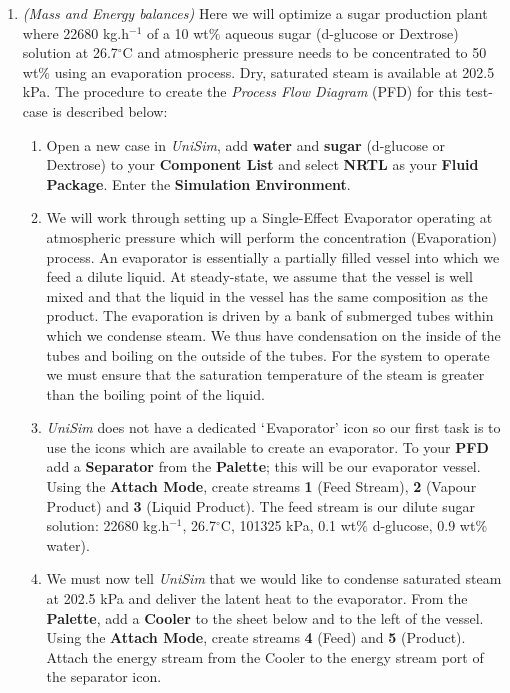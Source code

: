 \documentclass[12pts,a4paper,amsmath,amssymb,floatfix]{article}%
\begin{document}
\begin{enumerate}[label=\bfseries Problem \arabic*]
\clearpage
\item\label{MassBalance} {\it (Mass and Energy balances)} Here we will optimize a sugar production plant where 22680 kg.h$^{-1}$ of a 10 wt$\%$ aqueous sugar (d-glucose or Dextrose) solution at 26.7$^{\circ}$C and atmospheric pressure needs to be concentrated to 50 wt$\%$ using an evaporation process.  Dry, saturated steam is available at 202.5 kPa. The procedure to create the {\it Process Flow Diagram} (PFD) for this test-case is described below:
%
\begin{enumerate}
%
\item Open a new case in {\it UniSim}, add {\bf water} and {\bf sugar} (d-glucose or Dextrose) to your {\bf Component List} and select {\bf NRTL} as your {\bf Fluid Package}.  Enter the {\bf Simulation Environment}.
%
\item We will work through setting up a Single-Effect Evaporator operating at atmospheric pressure which will perform the concentration (Evaporation) process.  An evaporator is essentially a partially filled vessel into which we feed a dilute liquid.  At steady-state, we assume that the vessel is well mixed and that the liquid in the vessel has the same composition as the product.  The evaporation is driven by a bank of submerged tubes within which we condense steam.  We thus have condensation on the inside of the tubes and boiling on the outside of the tubes.  For the system to operate we must ensure that the saturation temperature of the steam is greater than the boiling point of the liquid.
%
\item {\it UniSim} does not have a dedicated $\lq$Evaporator' icon so our first task is to use the icons which are available to create an evaporator.  To your {\bf PFD} add a {\bf Separator} from the {\bf Palette}; this will be our evaporator vessel.  Using the {\bf Attach Mode}, create streams {\bf 1} (Feed Stream), {\bf 2} (Vapour Product) and {\bf 3} (Liquid Product).  The feed stream is our dilute sugar solution:  22680 kg.h$^{-1}$, 26.7$^{\circ}$C, 101325 kPa, 0.1 wt$\%$ d-glucose, 0.9 wt$\%$ water).
%
\item We must now tell {\it UniSim} that we would like to condense saturated steam at 202.5 kPa and deliver the latent heat to the evaporator.  From the {\bf Palette}, add a {\bf Cooler} to the sheet below and to the left of the vessel.  Using the {\bf Attach Mode}, create streams {\bf 4} (Feed) and {\bf 5} (Product).  Attach the energy stream from the Cooler to the energy stream port of the separator icon.
%
      \begin{figure}[h]

\end{figure}
\end{enumerate}
\end{enumerate}
\end{document}
